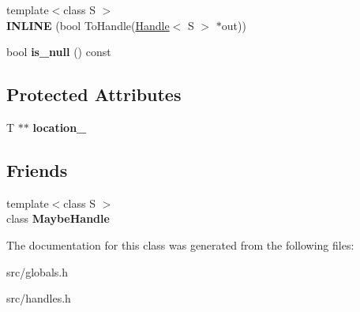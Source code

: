 \begin{DoxyCompactItemize}
\item 
\hypertarget{classv8_1_1internal_1_1_maybe_handle_a7dba04275a3cd9435a8922fefbd50870}{}{\footnotesize template$<$class S $>$ }\\{\bfseries I\+N\+L\+I\+N\+E} (bool To\+Handle(\hyperlink{classv8_1_1internal_1_1_handle}{Handle}$<$ S $>$ $\ast$out))\label{classv8_1_1internal_1_1_maybe_handle_a7dba04275a3cd9435a8922fefbd50870}

\item 
\hypertarget{classv8_1_1internal_1_1_maybe_handle_a36d37e001eeb9ebb2a1ac2a883937252}{}bool {\bfseries is\+\_\+null} () const \label{classv8_1_1internal_1_1_maybe_handle_a36d37e001eeb9ebb2a1ac2a883937252}

\end{DoxyCompactItemize}
\subsection*{Protected Attributes}
\begin{DoxyCompactItemize}
\item 
\hypertarget{classv8_1_1internal_1_1_maybe_handle_a20138eb8f5c61e4383463c739b2a8418}{}T $\ast$$\ast$ {\bfseries location\+\_\+}\label{classv8_1_1internal_1_1_maybe_handle_a20138eb8f5c61e4383463c739b2a8418}

\end{DoxyCompactItemize}
\subsection*{Friends}
\begin{DoxyCompactItemize}
\item 
\hypertarget{classv8_1_1internal_1_1_maybe_handle_a43ca95cbc5708225727b3674f4690233}{}{\footnotesize template$<$class S $>$ }\\class {\bfseries Maybe\+Handle}\label{classv8_1_1internal_1_1_maybe_handle_a43ca95cbc5708225727b3674f4690233}

\end{DoxyCompactItemize}


The documentation for this class was generated from the following files\+:\begin{DoxyCompactItemize}
\item 
src/globals.\+h\item 
src/handles.\+h\end{DoxyCompactItemize}
